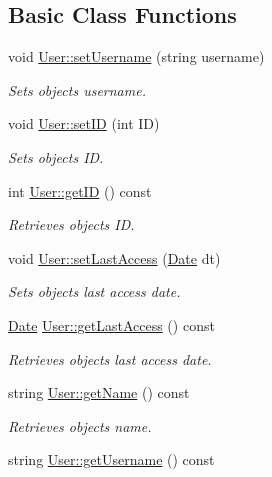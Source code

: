 \subsection*{Basic Class Functions}
\begin{DoxyCompactItemize}
\item 
void \hyperlink{group___user_ga0fed77d10cd142ee4112d650ec564e6b}{User\+::set\+Username} (string username)
\begin{DoxyCompactList}\small\item\em Sets object\textquotesingle{}s username. \end{DoxyCompactList}\item 
void \hyperlink{group___user_ga95feef2641a3141ef514a0bd52c3aaa2}{User\+::set\+ID} (int ID)
\begin{DoxyCompactList}\small\item\em Sets object\textquotesingle{}s ID. \end{DoxyCompactList}\item 
int \hyperlink{group___user_ga986c6f30aeac167bb5d311dd412cf604}{User\+::get\+ID} () const
\begin{DoxyCompactList}\small\item\em Retrieves object\textquotesingle{}s ID. \end{DoxyCompactList}\item 
void \hyperlink{group___user_ga5578e73f0915b2ebf38eff4434fc340d}{User\+::set\+Last\+Access} (\hyperlink{class_date}{Date} dt)
\begin{DoxyCompactList}\small\item\em Sets object\textquotesingle{}s last access date. \end{DoxyCompactList}\item 
\hyperlink{class_date}{Date} \hyperlink{group___user_ga9399e8ad03d939281357fe2e1d2a0f71}{User\+::get\+Last\+Access} () const
\begin{DoxyCompactList}\small\item\em Retrieves object\textquotesingle{}s last access date. \end{DoxyCompactList}\item 
string \hyperlink{group___user_gab9b2b5feb6bdd1582696eb6d44cee384}{User\+::get\+Name} () const
\begin{DoxyCompactList}\small\item\em Retrieves object\textquotesingle{}s name. \end{DoxyCompactList}\item 
string \hyperlink{group___user_ga82e034043e04b2d750c654c8b2f2ce78}{User\+::get\+Username} () const

\end{DoxyCompactItemize}
